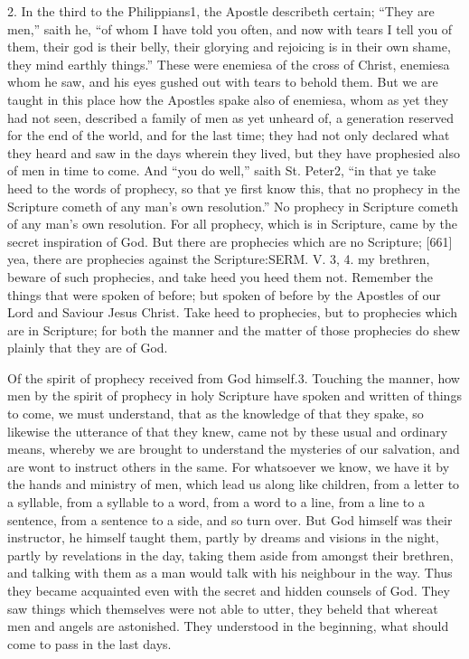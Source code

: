2. In the third to the Philippians1, the Apostle describeth certain; “They are men,” saith he, “of whom I have told you often, and now with tears I tell you of them, their god is their belly, their glorying and rejoicing is in their own shame, they mind earthly things.” These were enemiesa of the cross of Christ, enemiesa whom he saw, and his eyes gushed out with tears to behold them. But we are taught in this place how the Apostles spake also of enemiesa, whom as yet they had not seen, described a family of men as yet unheard of, a generation reserved for the end of the world, and for the last time; they had not only declared what they heard and saw in the days wherein they lived, but they have prophesied also of men in time to come. And “you do well,” saith St. Peter2, “in that ye take heed to the words of prophecy, so that ye first know this, that no prophecy in the Scripture cometh of any man’s own resolution.” No prophecy in Scripture cometh of any man’s own resolution. For all prophecy, which is in Scripture, came by the secret inspiration of God. But there are prophecies which are no Scripture; [661] yea, there are prophecies against the Scripture:SERM. V. 3, 4. my brethren, beware of such prophecies, and take heed you heed them not. Remember the things that were spoken of before; but spoken of before by the Apostles of our Lord and Saviour Jesus Christ. Take heed to prophecies, but to prophecies which are in Scripture; for both the manner and the matter of those prophecies do shew plainly that they are of God.

Of the spirit of prophecy received from God himself.3. Touching the manner, how men by the spirit of prophecy in holy Scripture have spoken and written of things to come, we must understand, that as the knowledge of that they spake, so likewise the utterance of that they knew, came not by these usual and ordinary means, whereby we are brought to understand the mysteries of our salvation, and are wont to instruct others in the same. For whatsoever we know, we have it by the hands and ministry of men, which lead us along like children, from a letter to a syllable, from a syllable to a word, from a word to a line, from a line to a sentence, from a sentence to a side, and so turn over. But God himself was their instructor, he himself taught them, partly by dreams and visions in the night, partly by revelations in the day, taking them aside from amongst their brethren, and talking with them as a man would talk with his neighbour in the way. Thus they became acquainted even with the secret and hidden counsels of God. They saw things which themselves were not able to utter, they beheld that whereat men and angels are astonished. They understood in the beginning, what should come to pass in the last days.

